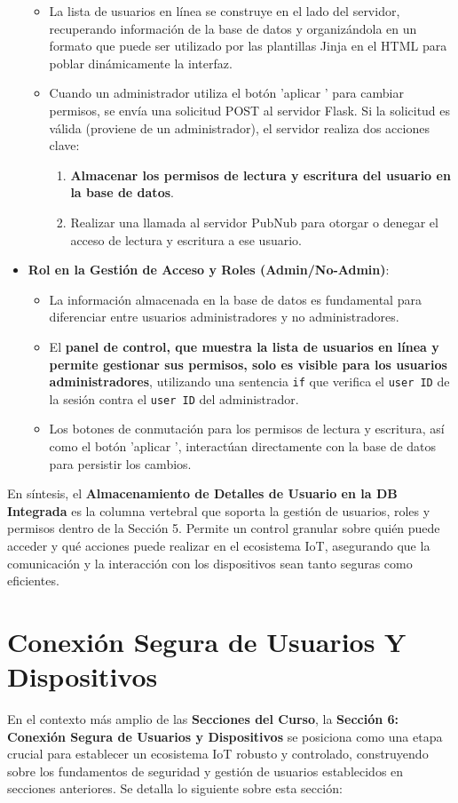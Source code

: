 \documentclass{report}
\begin{document}
\begin{itemize}
\begin{itemize}
        \item La lista de usuarios en línea se construye en el lado del servidor, recuperando información de la base de datos y organizándola en un 
        formato que puede ser utilizado por las plantillas Jinja en el HTML para poblar dinámicamente la interfaz.
        \item Cuando un administrador utiliza el botón  'aplicar ' para cambiar permisos, se envía una solicitud POST al servidor Flask. Si la solicitud 
        es válida (proviene de un administrador), el servidor realiza dos acciones clave:
        \begin{enumerate}
            \item \textbf{Almacenar los permisos de lectura y escritura del usuario en la base de datos}.
            \item Realizar una llamada al servidor PubNub para otorgar o denegar el acceso de lectura y escritura a ese usuario.
        \end{enumerate}
    \end{itemize}
    \item \textbf{Rol en la Gestión de Acceso y Roles (Admin/No-Admin)}:
    \begin{itemize}
        \item La información almacenada en la base de datos es fundamental para diferenciar entre usuarios administradores y no administradores.
        \item El \textbf{panel de control, que muestra la lista de usuarios en línea y permite gestionar sus permisos, solo es visible para los usuarios 
        administradores}, utilizando una sentencia \texttt{if} que verifica el \texttt{user ID} de la sesión contra el \texttt{user ID} del administrador.
        \item Los botones de conmutación para los permisos de lectura y escritura, así como el botón  'aplicar ', interactúan directamente con la base de 
        datos para persistir los cambios.
    \end{itemize}
\end{itemize}
En síntesis, el \textbf{Almacenamiento de Detalles de Usuario en la DB Integrada} es la columna vertebral que soporta la gestión de usuarios, roles y 
permisos dentro de la Sección 5. Permite un control granular sobre quién puede acceder y qué acciones puede realizar en el ecosistema IoT, asegurando 
que la comunicación y la interacción con los dispositivos sean tanto seguras como eficientes.

\section{Conexión Segura de Usuarios Y Dispositivos}
En el contexto más amplio de las \textbf{Secciones del Curso}, la \textbf{Sección 6: Conexión Segura de Usuarios y Dispositivos} se posiciona como una 
etapa crucial para establecer un ecosistema IoT robusto y controlado, construyendo sobre los fundamentos de seguridad y gestión de usuarios establecidos 
en secciones anteriores. Se detalla lo siguiente sobre esta sección:
\end{document}
